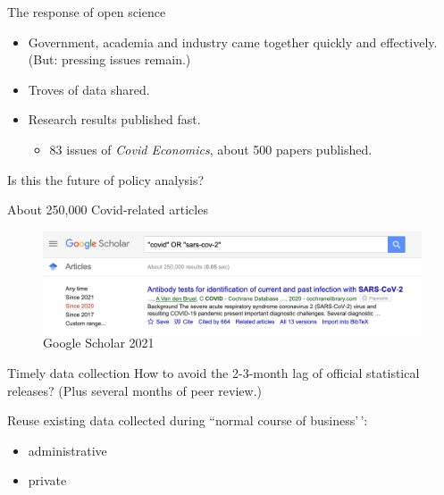 \documentclass[
  ignorenonframetext,
  aspectratio=54,
]{beamer}
\providecommand{\tightlist}{%
  \setlength{\itemsep}{0pt}\setlength{\parskip}{0pt}}
\begin{document}
\begin{frame}{The response of open science}
\protect\hypertarget{the-response-of-open-science-1}{}
\begin{itemize}
\tightlist
\item
  Government, academia and industry came together quickly and
  effectively. (But: pressing issues remain.)
\item
  Troves of data shared.
\item
  Research results published fast.

  \begin{itemize}
  \tightlist
  \item
    83 issues of \emph{Covid Economics}, about 500 papers published.
  \end{itemize}
\end{itemize}

\begin{block}{Is this the future of policy analysis?}
\protect\hypertarget{is-this-the-future-of-policy-analysis}{}
\end{block}
\end{frame}

\begin{frame}{About 250,000 Covid-related articles}
\protect\hypertarget{about-250000-covid-related-articles}{}
\begin{figure}
\centering
\includegraphics{exhibit/fig/google-scholar.png}
\caption{Google Scholar 2021}
\end{figure}
\end{frame}

\begin{frame}{Timely data collection}
\protect\hypertarget{timely-data-collection}{}
How to avoid the 2-3-month lag of official statistical releases? (Plus
several months of peer review.)

Reuse existing data collected during ``normal course of business'\,':

\begin{itemize}
\tightlist
\item
  administrative
\item
  private
\end{itemize}
\end{frame}
\end{document}
